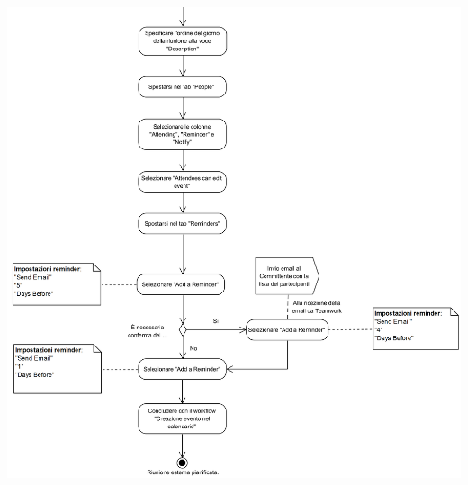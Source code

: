 \begin{center}
	\includegraphics[width=15cm]{./DiagrammiProcedure/RiunioneEsterna2.png}
\end{center}


